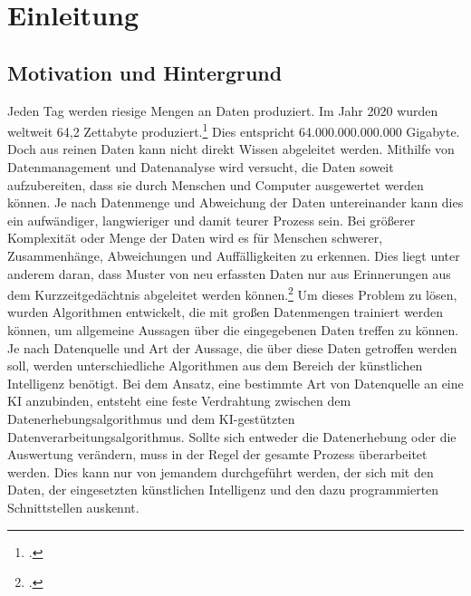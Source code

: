 \section{Einleitung}
\subsection{Motivation und Hintergrund}
Jeden Tag werden riesige Mengen an Daten produziert. Im Jahr 2020 wurden weltweit
64,2 Zettabyte produziert.\footcite{statista2022daten} Dies entspricht 64.000.000.000.000 Gigabyte. Doch aus reinen Daten kann nicht direkt Wissen abgeleitet werden. Mithilfe von Datenmanagement und Datenanalyse wird versucht, die Daten soweit aufzubereiten, dass sie durch Menschen und Computer ausgewertet werden können. Je nach Datenmenge und Abweichung der Daten untereinander kann dies ein aufwändiger, langwieriger und damit teurer Prozess sein. Bei größerer Komplexität oder Menge der Daten wird es für Menschen schwerer, Zusammenhänge, Abweichungen und Auffälligkeiten zu erkennen. Dies liegt unter anderem daran, dass Muster von neu erfassten Daten nur aus Erinnerungen aus dem Kurzzeitgedächtnis abgeleitet werden können.\footcite{snyder2000music} Um dieses Problem zu lösen, wurden Algorithmen entwickelt, die mit großen Datenmengen trainiert werden können, um allgemeine Aussagen über die eingegebenen Daten treffen zu können. Je nach Datenquelle und Art der Aussage, die über diese Daten getroffen werden soll, werden unterschiedliche Algorithmen aus dem Bereich der künstlichen Intelligenz benötigt. Bei dem Ansatz, eine bestimmte Art von Datenquelle an eine KI anzubinden, entsteht eine feste Verdrahtung zwischen dem Datenerhebungsalgorithmus und dem KI-gestützten Datenverarbeitungsalgorithmus. Sollte sich entweder die Datenerhebung oder die Auswertung verändern, muss in der Regel der gesamte Prozess überarbeitet werden. Dies kann nur von jemandem durchgeführt werden, der sich mit den Daten, der eingesetzten künstlichen Intelligenz und den dazu programmierten Schnittstellen auskennt.


